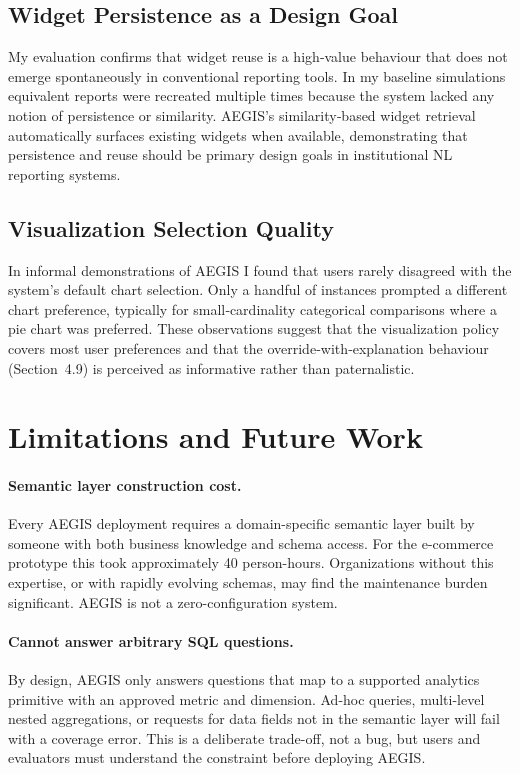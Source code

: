 \documentclass[11pt]{article}
\begin{document}
\subsection{Widget Persistence as a Design Goal}
My evaluation confirms that widget reuse is a high‑value behaviour that does not emerge spontaneously in conventional reporting tools. In my baseline simulations equivalent reports were recreated multiple times because the system lacked any notion of persistence or similarity. AEGIS’s similarity‑based widget retrieval automatically surfaces existing widgets when available, demonstrating that persistence and reuse should be primary design goals in institutional NL reporting systems.

\subsection{Visualization Selection Quality}
In informal demonstrations of AEGIS I found that users rarely disagreed with the system’s default chart selection. Only a handful of instances prompted a different chart preference, typically for small‑cardinality categorical comparisons where a pie chart was preferred. These observations suggest that the visualization policy covers most user preferences and that the override‑with‑explanation behaviour (Section 4.9) is perceived as informative rather than paternalistic.

\section{Limitations and Future Work\label{sec:limitations}}
\paragraph{Semantic layer construction cost.} Every AEGIS deployment requires a domain-specific semantic layer built by someone with both business knowledge and schema access. For the e-commerce prototype this took approximately 40 person-hours. Organizations without this expertise, or with rapidly evolving schemas, may find the maintenance burden significant. AEGIS is not a zero-configuration system.

\paragraph{Cannot answer arbitrary SQL questions.} By design, AEGIS only answers questions that map to a supported analytics primitive with an approved metric and dimension. Ad-hoc queries, multi-level nested aggregations, or requests for data fields not in the semantic layer will fail with a coverage error. This is a deliberate trade-off, not a bug, but users and evaluators must understand the constraint before deploying AEGIS.
\end{document}
